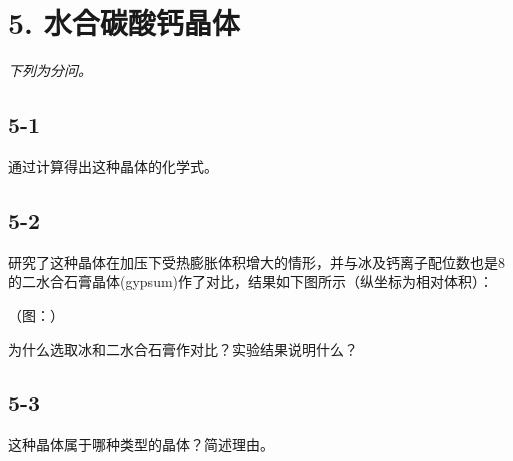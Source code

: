 \section*{5. 水合碳酸钙晶体}
\textit{下列为分问。}

\subsection*{5-1}
通过计算得出这种晶体的化学式。

\subsection*{5-2}
研究了这种晶体在加压下受热膨胀体积增⼤的情形，并与冰及钙离⼦配位数也是8的⼆⽔合⽯膏晶体(gypsum)作了对⽐，结果如下图所⽰（纵坐标为相对体积）：

（图：）

为什么选取冰和⼆⽔合⽯膏作对⽐？实验结果说明什么？

\subsection*{5-3}
这种晶体属于哪种类型的晶体？简述理由。
